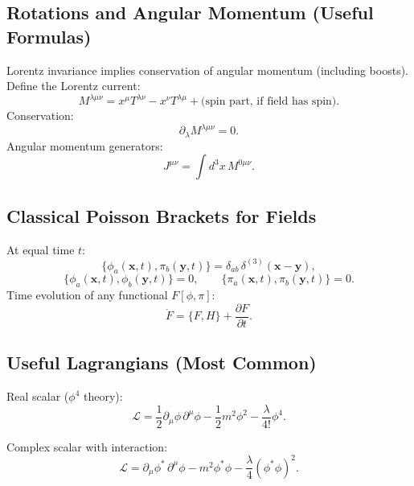 \subsection{Rotations and Angular Momentum (Useful Formulas)}
Lorentz invariance implies conservation of angular momentum (including boosts).
Define the Lorentz current:
\begin{equation}
M^{\lambda\mu\nu}
=
x^\mu T^{\lambda\nu} - x^\nu T^{\lambda\mu}
+\text{(spin part, if field has spin)}.
\end{equation}
Conservation:
\begin{equation}
\partial_\lambda M^{\lambda\mu\nu}=0.
\end{equation}
Angular momentum generators:
\begin{equation}
J^{\mu\nu} = \int d^3x\, M^{0\mu\nu}.
\end{equation}

\subsection{Classical Poisson Brackets for Fields}
At equal time $t$:
\begin{equation}
\{\phi_a(\mathbf{x},t),\pi_b(\mathbf{y},t)\}
=\delta_{ab}\,\delta^{(3)}(\mathbf{x}-\mathbf{y}),
\end{equation}
\begin{equation}
\{\phi_a(\mathbf{x},t),\phi_b(\mathbf{y},t)\}=0,
\qquad
\{\pi_a(\mathbf{x},t),\pi_b(\mathbf{y},t)\}=0.
\end{equation}
Time evolution of any functional $F[\phi,\pi]$:
\begin{equation}
\dot{F}=\{F,H\}+\frac{\partial F}{\partial t}.
\end{equation}

\subsection{Useful Lagrangians (Most Common)}
Real scalar ($\phi^4$ theory):
\begin{equation}
\mathcal{L}
=\frac{1}{2}\partial_\mu\phi\,\partial^\mu\phi
-\frac{1}{2}m^2\phi^2
-\frac{\lambda}{4!}\phi^4.
\end{equation}

Complex scalar with interaction:
\begin{equation}
\mathcal{L}
=\partial_\mu\phi^\ast\,\partial^\mu\phi
-m^2\phi^\ast\phi
-\frac{\lambda}{4}(\phi^\ast\phi)^2.
\end{equation}

